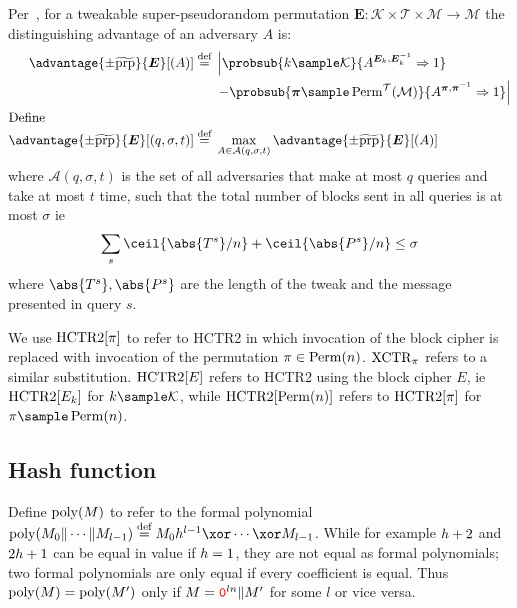 \documentclass[hctr2.tex]{subfiles}
\begin{document}
Per~\cite{cmc}, for a tweakable super-pseudorandom permutation
$\bm{E} : \mathcal{K} \times \mathcal{T} \times \mathcal{M} \rightarrow \mathcal{M}$
the distinguishing advantage of an adversary $A$ is:
%
\begin{align*}
    \advantage{\pm \widetilde{\mathrm{prp}}}{\bm{E}}[(A)] \defeq
    {}&\left\lvert\probsub{k \sample \mathcal{K}}{A^{\bm{E}_k,\bm{E}_k^{-1}}\Rightarrow 1}\right.
    \\
    {}&\left. - \probsub{\bm{\pi} \sample \Perm^\mathcal{T}(\mathcal{M})}
        {A^{\bm{\pi},\bm{\pi}^{-1}}\Rightarrow 1}\right\rvert
    \\
    \intertext{Define}
    \advantage{\pm \widetilde{\mathrm{prp}}}{\bm{E}}[(q, \sigma, t)]
    \defeq {}&
    \max_{A \in \mathcal{A}(q, \sigma, t)} \advantage{\pm \widetilde{\mathrm{prp}}}{\bm{E}}[(A)]
\end{align*}
where \(\mathcal{A}(q, \sigma, t)\)
is the set of all adversaries 
that make at most \(q\) queries
and take at most \(t\) time,
such that the total number of blocks sent in all queries is
at most \(\sigma\) ie
\begin{displaymath}
    \sum_s \ceil{\abs{T^s}/n} + \ceil{\abs{P^s}/n} \leq \sigma
\end{displaymath}
where \(\abs{T^s}, \abs{P^s}\) are the length of the tweak and the message presented in query \(s\).

We use \(\operatorname{HCTR2}[\pi]\) to refer to HCTR2 in which invocation
of the block cipher is replaced with invocation of the
permutation \(\pi \in \operatorname{Perm}(n)\).
\(\operatorname{XCTR}_\pi\) refers to a similar substitution.
\(\operatorname{HCTR2}[E]\) refers to HCTR2 using the block cipher \(E\),
ie \(\operatorname{HCTR2}[E_k]\) for \(k \sample \mathcal{K}\), while
\(\operatorname{HCTR2}[\operatorname{Perm}(n)]\) refers to \(\operatorname{HCTR2}[\pi]\)
for \(\pi \sample \Perm(n)\).

\subsection{Hash function}\label{hproperties}
Define \(\operatorname{poly}(M)\) to refer to the formal polynomial
\(\poly(M_0 \Concat \cdots \Concat M_{l-1})
\defeq  M_0\hpoly^{l-1} \xor \cdots \xor M_{l-1}\).
While for example \(h + 2\) and \(2h + 1\) can be equal
in value if \(h = 1\),
they are not equal as formal polynomials;
two formal polynomials are only equal
if every coefficient is equal. Thus \(\operatorname{poly}(M) = \operatorname{poly}(M')\)
only if \(M = \bino^{ln} \Concat M'\) for some \(l\) or vice versa.
\end{document}
